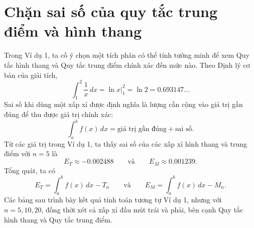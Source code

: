 \documentclass[12pt,a4paper]{article}
\begin{document}
\section*{Chặn sai số của quy tắc trung điểm và hình thang}
Trong Ví dụ 1, ta cố ý chọn một tích phân có thể tính tường minh để xem Quy tắc hình thang và Quy tắc trung điểm chính xác đến mức nào. Theo Định lý cơ bản của giải tích,
\[\int_1^2\frac1x\,dx=\ln x\big|_1^2=\ln2=0.693147\ldots\]
Sai số khi dùng một xấp xỉ được định nghĩa là lượng cần cộng vào giá trị gần đúng để thu được giá trị chính xác:
\[\int_a^b f(x)\,dx=\text{giá trị gần đúng}+\text{sai số}.\]
Từ các giá trị trong Ví dụ 1, ta thấy sai số của các xấp xỉ hình thang và trung điểm với $n=5$ là
\[E_T\approx-0.002488\qquad\text{và}\qquad E_M\approx0.001239.\]
Tổng quát, ta có
\[E_T=\int_a^b f(x)\,dx-T_n\qquad\text{và}\qquad
E_M=\int_a^b f(x)\,dx-M_n.\]
Các bảng sau trình bày kết quả tính toán tương tự Ví dụ 1, nhưng với $n=5,10,20$, đồng thời xét cả xấp xỉ đầu mút trái và phải, bên cạnh Quy tắc hình thang và Quy tắc trung điểm.
\end{document}
